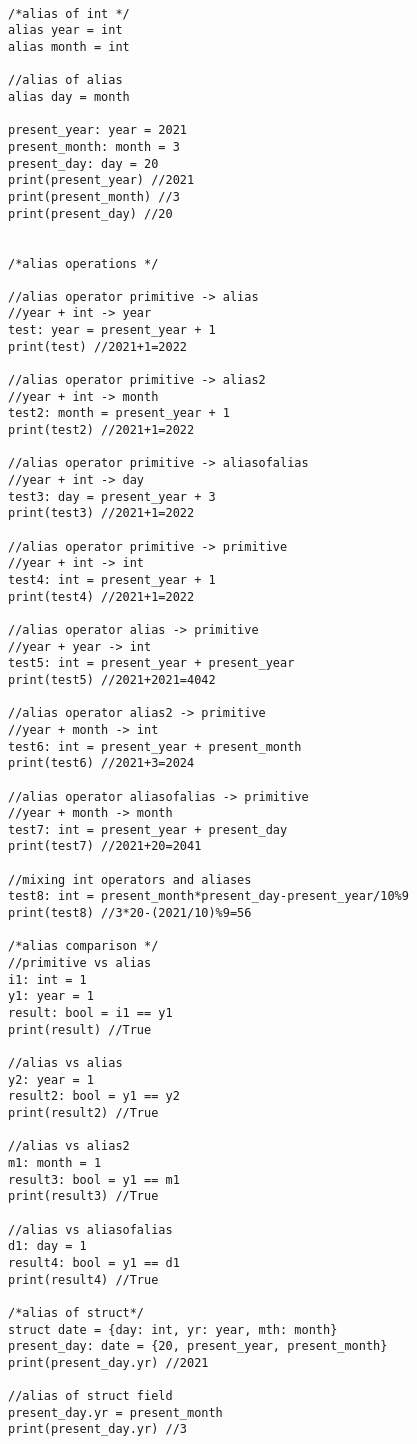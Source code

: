 \documentclass[main.tex]{subfiles}
\begin{document}
\begin{lstlisting}

/*alias of int */
alias year = int
alias month = int

//alias of alias
alias day = month 

present_year: year = 2021
present_month: month = 3
present_day: day = 20
print(present_year) //2021
print(present_month) //3
print(present_day) //20


/*alias operations */

//alias operator primitive -> alias
//year + int -> year
test: year = present_year + 1
print(test) //2021+1=2022

//alias operator primitive -> alias2
//year + int -> month
test2: month = present_year + 1
print(test2) //2021+1=2022

//alias operator primitive -> aliasofalias
//year + int -> day
test3: day = present_year + 3
print(test3) //2021+1=2022

//alias operator primitive -> primitive
//year + int -> int
test4: int = present_year + 1
print(test4) //2021+1=2022

//alias operator alias -> primitive
//year + year -> int
test5: int = present_year + present_year
print(test5) //2021+2021=4042

//alias operator alias2 -> primitive
//year + month -> int
test6: int = present_year + present_month
print(test6) //2021+3=2024

//alias operator aliasofalias -> primitive
//year + month -> month
test7: int = present_year + present_day
print(test7) //2021+20=2041

//mixing int operators and aliases
test8: int = present_month*present_day-present_year/10%9
print(test8) //3*20-(2021/10)%9=56

/*alias comparison */
//primitive vs alias
i1: int = 1
y1: year = 1
result: bool = i1 == y1
print(result) //True

//alias vs alias
y2: year = 1
result2: bool = y1 == y2
print(result2) //True

//alias vs alias2
m1: month = 1
result3: bool = y1 == m1
print(result3) //True

//alias vs aliasofalias
d1: day = 1
result4: bool = y1 == d1
print(result4) //True

/*alias of struct*/
struct date = {day: int, yr: year, mth: month}
present_day: date = {20, present_year, present_month}
print(present_day.yr) //2021

//alias of struct field
present_day.yr = present_month
print(present_day.yr) //3


\end{lstlisting}
\end{document}
